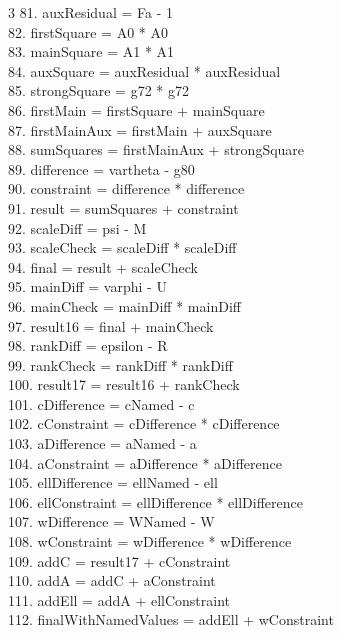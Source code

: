 \documentclass[10pt]{article}
\begin{document}
\begin{multicols}{3}
81. auxResidual = Fa - 1\\
82. firstSquare = A0 * A0\\
83. mainSquare = A1 * A1\\
84. auxSquare = auxResidual * auxResidual\\
85. strongSquare = g72 * g72\\
86. firstMain = firstSquare + mainSquare\\
87. firstMainAux = firstMain + auxSquare\\
88. sumSquares = firstMainAux + strongSquare\\
89. difference = vartheta - g80\\
90. constraint = difference * difference\\
91. result = sumSquares + constraint\\
92. scaleDiff = psi - M\\
93. scaleCheck = scaleDiff * scaleDiff\\
94. final = result + scaleCheck\\
95. mainDiff = varphi - U\\
96. mainCheck = mainDiff * mainDiff\\
97. result16 = final + mainCheck\\
98. rankDiff = epsilon - R\\
99. rankCheck = rankDiff * rankDiff\\
100. result17 = result16 + rankCheck\\
101. cDifference = cNamed - c\\
102. cConstraint = cDifference * cDifference\\
103. aDifference = aNamed - a\\
104. aConstraint = aDifference * aDifference\\
105. ellDifference = ellNamed - ell\\
106. ellConstraint = ellDifference * ellDifference\\
107. wDifference = WNamed - W\\
108. wConstraint = wDifference * wDifference\\
109. addC = result17 + cConstraint\\
110. addA = addC + aConstraint\\
111. addEll = addA + ellConstraint\\
112. finalWithNamedValues = addEll + wConstraint\\
\end{multicols}
\end{document}
